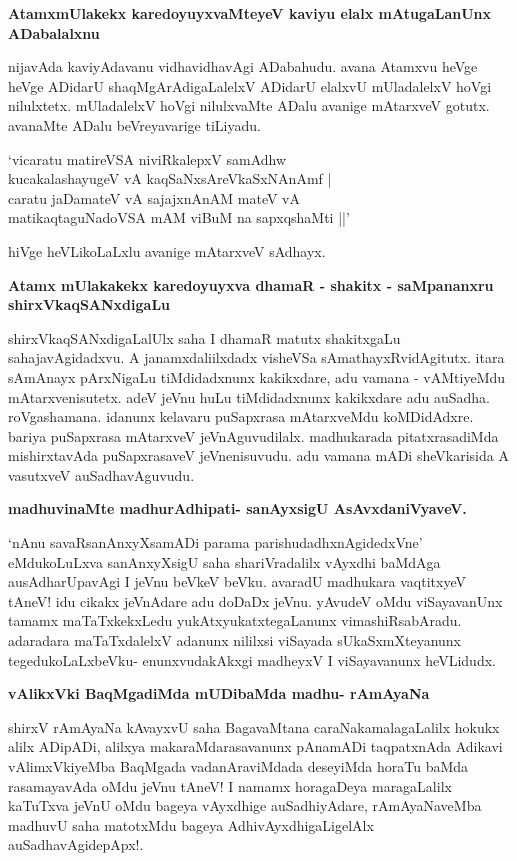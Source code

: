 {\bf AtamxmUlakekx karedoyuyxvaMteyeV kaviyu elalx mAtugaLanUnx ADabalalxnu}

nijavAda kaviyAdavanu vidhavidhavAgi ADabahudu. avana Atamxvu heVge heVge ADidarU shaqMgArAdigaLalelxV ADidarU elalxvU mUladalelxV hoVgi nilulxtetx. mUladalelxV hoVgi nilulxvaMte ADalu avanige mAtarxveV gotutx. avanaMte ADalu beVreyavarige tiLiyadu.

\begin{shloka}
`vicaratu matireVSA niviRkalepxV samAdhw \\
kucakalashayugeV vA kaqSaNxsAreVkaSxNAnAmf |\\
caratu jaDamateV vA sajajxnAnAM mateV vA \\
matikaqtaguNadoVSA mAM viBuM na sapxqshaMti ||'
\end{shloka}

hiVge heVLikoLaLxlu avanige mAtarxveV sAdhayx.

{\bf Atamx mUlakakekx karedoyuyxva dhamaR - shakitx - saMpananxru shirxVkaqSANxdigaLu}

shirxVkaqSANxdigaLalUlx saha I dhamaR matutx shakitxgaLu sahajavAgidadxvu. A janamxdaliilxdadx visheVSa sAmathayxRvidAgitutx. itara sAmAnayx pArxNigaLu tiMdidadxnunx kakikxdare, adu vamana - vAMtiyeMdu mAtarxvenisutetx. adeV jeVnu huLu tiMdidadxnunx kakikxdare adu auSadha. roVgashamana. idanunx kelavaru puSapxrasa mAtarxveMdu koMDidAdxre. bariya puSapxrasa mAtarxveV jeVnAguvudilalx. madhukarada pitatxrasadiMda mishirxtavAda puSapxrasaveV jeVnenisuvudu. adu vamana mADi sheVkarisida A vasutxveV auSadhavAguvudu.

{\bf madhuvinaMte madhurAdhipati- sanAyxsigU AsAvxdaniVyaveV.}

`nAnu savaRsanAnxyXsamADi parama parishudadhxnAgidedxVne' eMdukoLuLxva sanAnxyXsigU saha shariVradalilx vAyxdhi baMdAga ausAdharUpavAgi I jeVnu beVkeV beVku. avaradU madhukara vaqtitxyeV tAneV! idu cikakx jeVnAdare adu doDaDx jeVnu. yAvudeV oMdu viSayavanUnx tamamx maTaTxkekxLedu yukAtxyukatxtegaLanunx vimashiRsabAradu. adaradara maTaTxdalelxV adanunx nililxsi viSayada sUkaSxmXteyanunx tegedukoLaLxbeVku- enunxvudakAkxgi madheyxV I viSayavanunx heVLidudx.

{\bf vAlikxVki BaqMgadiMda mUDibaMda madhu- rAmAyaNa}

shirxV rAmAyaNa kAvayxvU saha BagavaMtana caraNakamalagaLalilx hokukx alilx ADipADi, alilxya makaraMdarasavanunx pAnamADi taqpatxnAda Adikavi vAlimxVkiyeMba BaqMgada vadanAraviMdada deseyiMda horaTu baMda rasamayavAda oMdu jeVnu tAneV! I namamx horagaDeya maragaLalilx kaTuTxva jeVnU oMdu bageya vAyxdhige auSadhiyAdare, rAmAyaNaveMba madhuvU saha matotxMdu bageya AdhivAyxdhigaLigelAlx auSadhavAgidepApx!.

